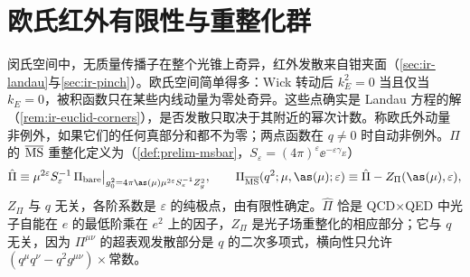 \section{欧氏红外有限性与重整化群}\label{sec:ee-euclid}

闵氏空间中，无质量传播子在整个光锥上奇异，红外发散来自钳夹面（\cref{sec:ir-landau}与\cref{sec:ir-pinch}）。欧氏空间简单得多：Wick 转动后 $k_E^2=0$ 当且仅当 $k_E=0$，被积函数只在某些内线动量为零处奇异。这些点确实是 Landau 方程的解（\cref{rem:ir-euclid-corners}），是否发散只取决于其附近的幂次计数。称欧氏外动量非例外，如果它们的任何真部分和都不为零；两点函数在 $q\ne0$ 时自动非例外。$\Pi$ 的 $\overline{\rm MS}$ 重整化定义为（\cref{def:prelim-msbar}，$S_\varepsilon=(4\pi)^\varepsilon\ee^{-\varepsilon\gamma_E}$）
\begin{equation}\label{eq:ee-PiMS}
\hat\Pi\equiv\mu^{2\varepsilon}S_\varepsilon^{-1}\,\Pi_{\rm bare}\big|_{g_0^2=4\pi\as(\mu)\mu^{2\varepsilon}S_\varepsilon^{-1}Z_g^2},\qquad
\Pi_{\overline{\rm MS}}(q^2;\mu,\as(\mu);\varepsilon)\equiv\hat\Pi-Z_\Pi(\as(\mu),\varepsilon),
\end{equation}
$Z_\Pi$ 与 $q$ 无关，各阶系数是 $\varepsilon$ 的纯极点，由有限性确定。$\hat\Pi$ 恰是 QCD$\times$QED 中光子自能在 $e$ 的最低阶乘在 $e^2$ 上的因子，$Z_\Pi$ 是光子场重整化的相应部分；它与 $q$ 无关，因为 $\Pi^{\mu\nu}$ 的超表观发散部分是 $q$ 的二次多项式，横向性只允许 $(q^\mu q^\nu-q^2g^{\mu\nu})\times$常数。

